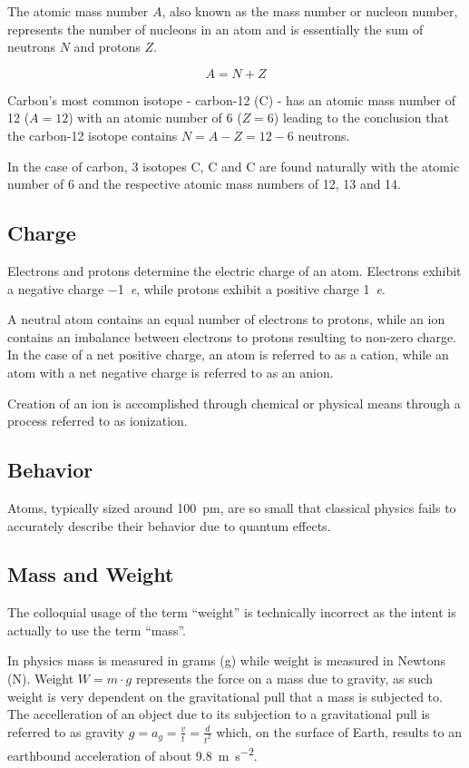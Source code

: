 The atomic mass number $A$, also known as the mass number or nucleon number,
represents the number of nucleons in an atom and is essentially the sum of
neutrons $N$ and protons $Z$.

$$A = N + Z$$

Carbon's most common isotope -  carbon-12 (C) - has an
atomic mass number of 12 ($A = 12$) with an atomic number of 6 ($Z = 6$)
leading to the conclusion that the carbon-12 isotope contains $N=A-Z=12-6$
neutrons.

In the case of carbon, 3 isotopes C, C and
C are found naturally with the atomic number of 6 and the
respective atomic mass numbers of 12, 13 and 14.

\subsection{Charge}

Electrons and protons determine the electric charge of an atom. Electrons
exhibit a negative charge \SI{-1}{\elementarycharge}, while protons exhibit a
positive charge \SI{1}{\elementarycharge}.

A neutral atom contains an equal number of electrons to protons, while an ion
contains an imbalance between electrons to protons resulting to non-zero charge.
In the case of a net positive charge, an atom is referred to as a
cation, while an atom with a net negative charge is referred to
as an anion.

Creation of an ion is accomplished through chemical or physical means through
a process referred to as ionization.

\subsection{Behavior}
Atoms, typically sized around \SI{100}{\pico\meter}, are so small that
classical physics fails to accurately describe their behavior due to quantum
effects.

\subsection{Mass and Weight}
The colloquial usage of the term ``weight'' is technically incorrect as the
intent is actually to use the term ``mass''.

In physics mass is measured in grams (\si{\gram}) while weight is measured in
Newtons (\si{\newton}).
Weight $W = m\cdot g$ represents the force on a mass due to
gravity, as such weight is very dependent on the gravitational pull that a
mass is subjected to.
The accelleration of an object due to its subjection to a gravitational pull is
referred to as gravity $g = a_g = \frac{v}{t} = \frac{d}{t^2}$
which, on the surface of Earth, results to an earthbound acceleration of about
\SI{9.8}{\meter\second^{-2}}.

